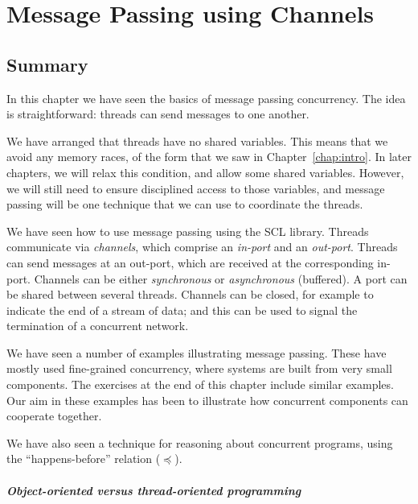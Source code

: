\chapter{Message Passing using Channels} 



\section{Summary}

In this chapter we have seen the basics of message passing concurrency.  The
idea is straightforward: threads can send messages to one another.

We have arranged that threads have no shared variables.  This means that we
avoid any memory races, of the form that we saw in Chapter~\ref{chap:intro}.
In later chapters, we will relax this condition, and allow some shared
variables.  However, we will still need to ensure disciplined access to those
variables, and message passing will be one technique that we can use to
coordinate the threads.  

We have seen how to use message passing using the SCL library.  Threads
communicate via \emph{channels}, which comprise an \emph{in-port} and an
\emph{out-port}.  Threads can send messages at an out-port, which are received
at the corresponding in-port.  Channels can be either \emph{synchronous} or
\emph{asynchronous} (buffered).  A port can be shared between several threads.
Channels can be closed, for example to indicate the end of a stream of data;
and this can be used to signal the termination of a concurrent network.  

We have seen a number of examples illustrating message passing.  These have
mostly used fine-grained concurrency, where systems are built from very small
components.  The exercises at the end of this chapter include similar
examples.  Our aim in these examples has been to illustrate how concurrent
components can cooperate together.

We have also seen a technique for reasoning about concurrent programs, using
the ``happens-before'' relation ($\preceq$).


\paragraph{Object-oriented versus thread-oriented programming}


